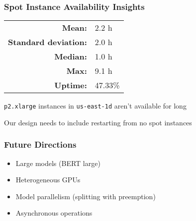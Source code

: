   \begin{frame}
    \frametitle{Spot Instance Availability Insights}

    \begin{tabular}{rl}
      \textbf{Mean:}               & 2.2 h   \\
      \textbf{Standard deviation:} & 2.0 h   \\
      \textbf{Median:}             & 1.0 h   \\
      \textbf{Max:}                & 9.1 h   \\
      \textbf{Uptime:}             & 47.33\% \\
    \end{tabular}

    \vspace{3em}

    \texttt{p2.xlarge} instances in \texttt{us-east-1d} aren't available for long

    \vspace{1em}

    Our design needs to include restarting from no spot instances
  \end{frame}

  \begin{frame}
    \frametitle{Future Directions}

    \begin{itemize}
      \item Large models (BERT large)
      \item Heterogeneous GPUs
      \item Model parallelism (splitting with preemption)
      \item Asynchronous operations
    \end{itemize}
  \end{frame}


